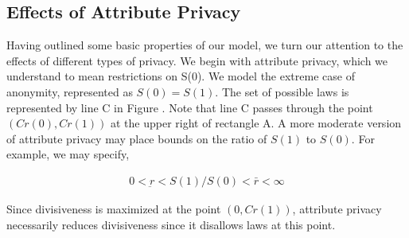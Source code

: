 \subsection{Effects of Attribute Privacy}

Having outlined some basic properties of our model, we turn our attention to the effects of different types of privacy.  We begin with attribute privacy, which we understand to mean restrictions on S(0).  We model the extreme case of anonymity, represented as $S(0) = S(1)$.  The set of possible laws is represented by line C in Figure .  Note that line C passes through the point $ \left(Cr(0), Cr(1) \right)$ at the upper right of rectangle A.  A more moderate version of attribute privacy may place bounds on the ratio of $S(1)$ to $S(0)$.  For example, we may specify,

\begin{align}
0 < \underbar r < S(1) /S(0) < \bar r < \infty
\end{align}

Since divisiveness is maximized at the point $ \left(0, Cr(1) \right)$, attribute privacy necessarily reduces divisiveness since it disallows laws at this point.


